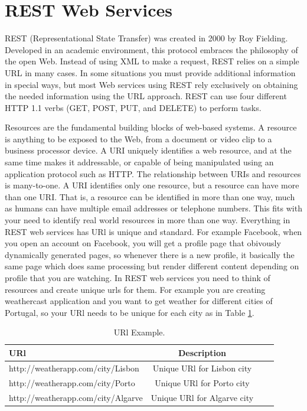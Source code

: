 \section{REST Web Services}
\label{section:rest}
REST (Representational State Transfer) was created in 2000 by Roy Fielding\citep{thesis:state5_1}. Developed in an academic environment, this protocol embraces the philosophy of the open Web. Instead of using XML to make a request, REST relies on a simple URL in many cases. In some situations you must provide additional information in special ways, but most Web services using REST rely exclusively on obtaining the needed information using the URL approach. REST can use four different HTTP 1.1 verbs (GET, POST, PUT, and DELETE) to perform tasks.

Resources are the fundamental building blocks of web-based systems. A resource is anything to be exposed to the Web,
from a document or video clip to a business processor device. A URI uniquely identifies a web resource, and at the same time makes it addressable, or capable of being manipulated using an application protocol such as HTTP. The relationship between URIs and resources is many-to-one\citep{thesis:state5_2}. A URI identifies only one resource, but a resource can have more than one URI. That is, a resource can be identified in more than one way, much as humans can have multiple email addresses or telephone numbers. This fits with your need to identify real world resources in more than one way. Everything in REST web services has URl is unique and standard. For example Facebook, when you open an account on Facebook, you will get a profile page that obivously dynamically generated pages, so whenever there is a new profile, it basically the same page which does same processing but render different content depending on profile that you are watching. In REST web services you need to think of resources and create unique urls for them. For example you are creating weathercast application and you want to get weather for different cities of Portugal, so your URl needs to be unique for each city as in Table \ref{tab:urlexample}.

\begin{table}[!htb]
  \renewcommand{\arraystretch}{1.2} %
  \centering
  \begin{tabular}{lccc}
    \toprule
    URl & Description  \\
    \midrule
    http://weatherapp.com/city/Lisbon &  Unique URl for Lisbon city\\
    http://weatherapp.com/city/Porto & Unique URl for Porto city\\
    http://weatherapp.com/city/Algarve & Unique URl for Algarve city\\
    \bottomrule
  \end{tabular}
  \caption[URl Example.]{URl Example.}
  \label{tab:urlexample}
\end{table}

